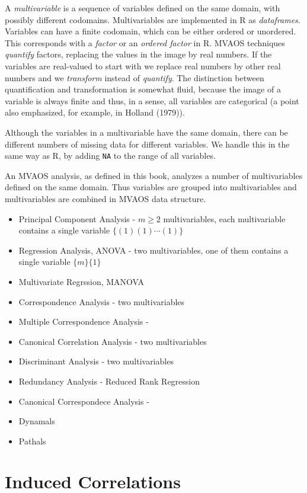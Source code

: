 \documentclass[
  12pt,
  letterpaper,
  DIV=11,
  numbers=noendperiod]{scrreprt}
\providecommand{\tightlist}{%
  \setlength{\itemsep}{0pt}\setlength{\parskip}{0pt}}
\begin{document}
A \emph{multivariable} is a sequence of variables defined on the same
domain, with possibly different codomains. Multivariables are
implemented in R as \emph{dataframes}. Variables can have a finite
codomain, which can be either ordered or unordered. This corresponds
with a \emph{factor} or an \emph{ordered factor} in R. MVAOS techniques
\emph{quantify} factors, replacing the values in the image by real
numbers. If the variables are real-valued to start with we replace real
numbers by other real numbers and we \emph{transform} instead of
\emph{quantify}. The distinction between quantification and
transformation is somewhat fluid, because the image of a variable is
always finite and thus, in a sense, all variables are categorical (a
point also emphasized, for example, in Holland (1979)).

Although the variables in a multivariable have the same domain, there
can be different numbers of missing data for different variables. We
handle this in the same way as R, by adding \texttt{NA} to the range of
all variables.

An MVAOS analysis, as defined in this book, analyzes a number of
multivariables defined on the same domain. Thus variables are grouped
into multivariables and multivariables are combined in MVAOS data
structure.

\begin{itemize}
\tightlist
\item
  Principal Component Analysis - \(m\geq 2\) multivariables, each
  multivariable contains a single variable \(\{(1)(1)\cdots (1)\}\)
\item
  Regression Analysis, ANOVA - two multivariables, one of them contains
  a single variable \(\{m\}\{1\}\)
\item
  Multivariate Regrssion, MANOVA
\item
  Correspondence Analysis - two multivariables
\item
  Multiple Correspondence Analysis -
\item
  Canonical Correlation Analysis - two multivariables
\item
  Discriminant Analysis - two multivariables
\item
  Redundancy Analysis - Reduced Rank Regression
\item
  Canonical Correspondece Analysis -
\item
  Dynamals
\item
  Pathals
\end{itemize}

\section{Induced Correlations}\label{induced-correlations}
\end{document}
